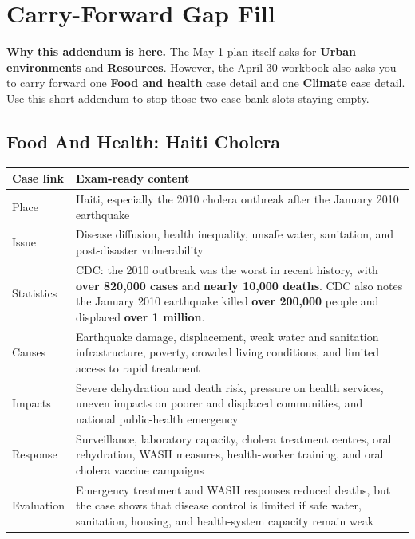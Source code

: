 \documentclass[11pt,a4paper]{article}
\newcommand{\term}[1]{\textcolor{HeadingBlue}{\textbf{#1}}}
\newcommand{\boxnote}[3]{%
\noindent\colorbox{#1}{%
  \begin{minipage}{0.965\textwidth}
  \sffamily
  \textbf{\textcolor{HeadingBlue}{#2}} #3
  \end{minipage}
}}
\begin{document}
\section{Carry-Forward Gap Fill}

\boxnote{SoftRed}{Why this addendum is here.}{The May 1 plan itself asks for
\term{Urban environments} and \term{Resources}. However, the April 30 workbook
also asks you to carry forward one \term{Food and health} case detail and one
\term{Climate} case detail. Use this short addendum to stop those two case-bank
slots staying empty.}

\subsection{Food And Health: Haiti Cholera}

\begin{tabularx}{\textwidth}{L{0.18\textwidth}Y}
\toprule
\textbf{Case link} & \textbf{Exam-ready content} \\
\midrule
Place & Haiti, especially the 2010 cholera outbreak after the January 2010
earthquake \\
Issue & Disease diffusion, health inequality, unsafe water, sanitation, and
post-disaster vulnerability \\
Statistics & CDC: the 2010 outbreak was the worst in recent history, with
\term{over 820,000 cases} and \term{nearly 10,000 deaths}. CDC also notes the
January 2010 earthquake killed \term{over 200,000} people and displaced
\term{over 1 million}. \\
Causes & Earthquake damage, displacement, weak water and sanitation
infrastructure, poverty, crowded living conditions, and limited access to rapid
treatment \\
Impacts & Severe dehydration and death risk, pressure on health services,
uneven impacts on poorer and displaced communities, and national public-health
emergency \\
Response & Surveillance, laboratory capacity, cholera treatment centres, oral
rehydration, WASH measures, health-worker training, and oral cholera vaccine
campaigns \\
Evaluation & Emergency treatment and WASH responses reduced deaths, but the
case shows that disease control is limited if safe water, sanitation, housing,
and health-system capacity remain weak \\
\bottomrule
\end{tabularx}
\end{document}
